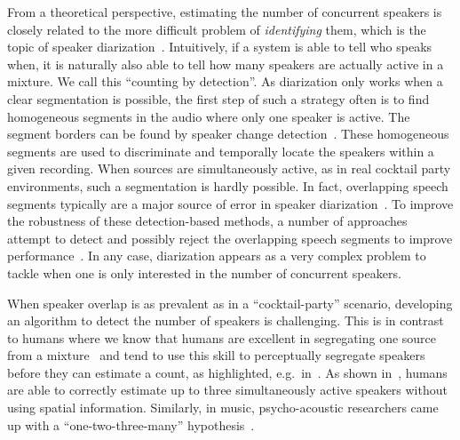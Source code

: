 From a theoretical perspective, estimating the number of concurrent speakers is closely related to the more difficult problem of \textit{identifying} them, which is the topic of speaker diarization~\cite{angueramiro12, rouvier13, rouvier15, ramaiah17}. Intuitively, if a system is able to tell who speaks when, it is naturally also able to tell how many speakers are actually active in a mixture. We call this ``counting by detection''.
As diarization only works when a clear segmentation is possible, the first step of such a strategy often is to find homogeneous segments in the audio where only one speaker is active.
The segment borders can be found by speaker change detection~\cite{Yin17}.
These homogeneous segments are used to discriminate and temporally locate the speakers within a given recording.
When sources are simultaneously active, as in real cocktail party environments, such a segmentation is hardly possible.
In fact, overlapping speech segments typically are a major source of error in speaker diarization~\cite{angueramiro12}.
To improve the robustness of these detection-based methods, a number of approaches attempt to detect and possibly reject the overlapping speech segments to improve performance~\cite{boakye08, huijbregts09, geiger13, andrei17}.
In any case, diarization appears as a very complex problem to tackle when one is only interested in the number of concurrent speakers.
\par
When speaker overlap is as prevalent as in a ``cocktail-party'' scenario, developing an algorithm to detect the number of speakers is challenging.
This is in contrast to humans where we know that humans are excellent in segregating one source from a mixture~\cite{bregman} and tend to use this skill to perceptually segregate speakers before they can estimate a count, as highlighted, e.g.\ in~\cite{kawashima15}.
As shown in~\cite{kashino96, kawashima15}, humans are able to correctly estimate up to three simultaneously active speakers without using spatial information.
Similarly, in music, psycho-acoustic researchers came up with a ``one-two-three-many'' hypothesis~\cite{huron89, stoeter13, schoeffler13}.
